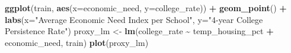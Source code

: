 \documentclass[
  man]{apa6}
\newenvironment{Shaded}{\begin{snugshade}}{\end{snugshade}}
\newcommand{\AttributeTok}[1]{\textcolor[rgb]{0.13,0.29,0.53}{#1}}
\newcommand{\FunctionTok}[1]{\textcolor[rgb]{0.13,0.29,0.53}{\textbf{#1}}}
\newcommand{\NormalTok}[1]{#1}
\newcommand{\OtherTok}[1]{\textcolor[rgb]{0.56,0.35,0.01}{#1}}
\newcommand{\SpecialCharTok}[1]{\textcolor[rgb]{0.81,0.36,0.00}{\textbf{#1}}}
\newcommand{\StringTok}[1]{\textcolor[rgb]{0.31,0.60,0.02}{#1}}
\begin{document}
\begin{Shaded}
\begin{Highlighting}[]
\FunctionTok{ggplot}\NormalTok{(train, }\FunctionTok{aes}\NormalTok{(}\AttributeTok{x=}\NormalTok{economic\_need, }\AttributeTok{y=}\NormalTok{college\_rate)) }\SpecialCharTok{+} \FunctionTok{geom\_point}\NormalTok{() }\SpecialCharTok{+}
  \FunctionTok{labs}\NormalTok{(}\AttributeTok{x=}\StringTok{"Average Economic Need Index per School"}\NormalTok{, }\AttributeTok{y=}\StringTok{"4{-}year College Persistence Rate"}\NormalTok{)}
\NormalTok{proxy\_lm }\OtherTok{\textless{}{-}} \FunctionTok{lm}\NormalTok{(college\_rate }\SpecialCharTok{\textasciitilde{}}\NormalTok{ temp\_housing\_pct }\SpecialCharTok{+}\NormalTok{ economic\_need, train)}
\FunctionTok{plot}\NormalTok{(proxy\_lm)}
\end{Highlighting}
\end{Shaded}
\end{document}

